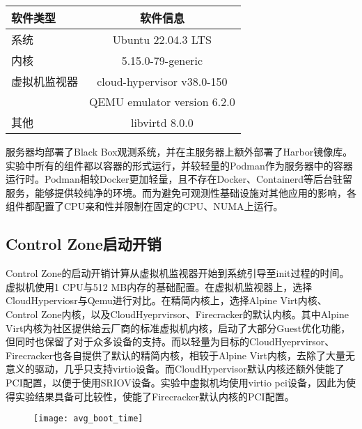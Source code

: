 \begin{table}[H]
    \label{tab:system_env}
    \footnotesize%
    \setlength{\tabcolsep}{30pt}%
    \renewcommand{\arraystretch}{1.25}%
    \centering
    \begin{tabular}{lc}
        \hline
        软件类型 & 软件信息 \\
        \hline
        系统 & Ubuntu 22.04.3 LTS  \\
        内核 & 5.15.0-79-generic \\
        虚拟机监视器 & cloud-hypervisor v38.0-150 \\
                   & QEMU emulator version 6.2.0 \\
        其他        & libvirtd 8.0.0 \\
        \hline
    \end{tabular}
\end{table}

服务器均部署了Black Box观测系统，并在主服务器上额外部署了Harbor镜像库。实验中所有的组件都以容器的形式运行，并较轻量的Podman作为服务器中的容器运行时。Podman相较Docker更加轻量，且不存在Docker、Containerd等后台驻留服务，能够提供较纯净的环境。而为避免可观测性基础设施对其他应用的影响，各组件都配置了CPU亲和性并限制在固定的CPU、NUMA上运行。

\subsection{Control Zone启动开销}

Control Zone的启动开销计算从虚拟机监视器开始到系统引导至init过程的时间。虚拟机使用1 CPU与512 MB内存的基础配置。在虚拟机监视器上，选择CloudHyperviosr与Qemu进行对比。在精简内核上，选择Alpine Virt内核、Control Zone内核，以及CloudHyeprvirsor、Firecracker的默认内核。其中Alpine Virt内核为社区提供给云厂商的标准虚拟机内核，启动了大部分Guest优化功能，但同时也保留了对于众多设备的支持。而以轻量为目标的CloudHyeprvirsor、Firecracker也各自提供了默认的精简内核，相较于Alpine Virt内核，去除了大量无意义的驱动，几乎只支持virtio设备。而CloudHypervisor默认内核还额外使能了PCI配置，以便于使用SRIOV设备。实验中虚拟机均使用virtio pci设备，因此为使得实验结果具备可比较性，使能了Firecracker默认内核的PCI配置。

\begin{figure}[H]
    \centering
    \texttt{[image: avg\_boot\_time]}
    \label{fig:avg_boot_time}
\end{figure}

